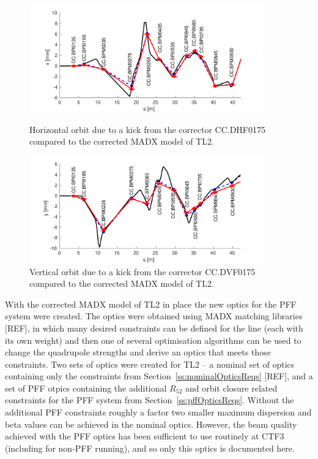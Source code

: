 \begin{figure}
  \centering
  \includegraphics[width=0.9\textwidth]{Figures/optics/modelCorrectedH}
  \caption{Horizontal orbit due to a kick from the corrector CC.DHF0175 compared to the corrected MADX model of TL2.}
  \label{f:modelCorrectedH}
  \includegraphics[width=0.9\textwidth]{Figures/optics/modelCorrectedV}
  \caption{Vertical orbit due to a kick from the corrector CC.DVF0175 compared to the corrected MADX model of TL2.}
  \label{f:modelCorrectedV}
\end{figure}


With the corrected MADX model of TL2 in place the new optics for the PFF system were created. The optics were obtained using MADX matching libraries [REF], in which many desired constraints can be defined for the line (each with its own weight) and then one of several optimisation algorithms can be used to change the quadrupole strengths and derive an optics that meets those constraints. Two sets of optics were created for TL2 -- a nominal set of optics containing only the constraints from Section~\ref{ss:nominalOpticsReqs} [REF], and a set of PFF otpics containing the additional \(R_{52}\) and orbit closure related constraints for the PFF system from Section~\ref{ss:pffOpticsReqs}. Without the additional PFF constraints roughly a factor two smaller maximum dispersion and beta values can be achieved in the nominal optics. However, the beam quality achieved with the PFF optics has been sufficient to use routinely at CTF3 (including for non-PFF running), and so only this optics is documented here.

